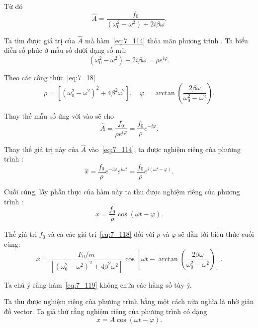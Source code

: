\noindent
Từ đó
\begin{equation}\label{eq:7_116}
	\hat{A} = \frac{f_0}{\left(\omega_0^2 - \omega^2\right) + 2i\beta\omega}.
\end{equation}

\noindent
Ta tìm được giá trị của $\hat{A}$ mà hàm~\eqref{eq:7_114} thỏa mãn phương trình . Ta biểu diễn số phức ở mẫu số dưới dạng số mũ:
\begin{equation}\label{eq:7_117}
	\left(\omega_0^2 - \omega^2\right) + 2i\beta\omega = \rho e^{i\varphi}.
\end{equation}

\noindent
Theo các công thức~\eqref{eq:7_18}
\begin{equation}\label{eq:7_118}
	\rho = \left[\left(\omega_0^2 - \omega^2\right)^2 + 4\beta^2\omega^2\right],\quad  \varphi = \arctan\left(\frac{2\beta\omega}{\omega_0^2 - \omega^2}\right).
\end{equation}

Thay thế mẫu số ứng với  vào  sẽ cho
\begin{equation*}
	\hat{A} = \frac{f_0}{\rho e^{i\varphi}} = \frac{f_0}{\rho}e^{-i\varphi}.
\end{equation*}

\noindent
Thay thế giá trị này của $\hat{A}$ vào~\eqref{eq:7_114}, ta được nghiệm riêng của phương trình :
\begin{equation*}
	\hat{x} = \frac{f_0}{\rho} e^{-i\varphi} e^{i\omega t} = \frac{f_0}{\rho} e^{i(\omega t-\varphi)}.
\end{equation*}

\noindent
Cuối cùng, lấy phần thực của hàm này ta thu được nghiệm riêng của phương trình :
\begin{equation*}
	x = \frac{f_0}{\rho} \cos(\omega t-\varphi).
\end{equation*}

\noindent
Thế giá trị $f_0$ và cả các giá trị~\eqref{eq:7_118} đối với $\rho$ và $\varphi$ sẽ dẫn tới biểu thức cuối cùng:
\begin{equation}\label{eq:7_119}
	x = \frac{F_0/m}{\left[\left(\omega_0^2 - \omega^2\right)^2 + 4\beta^2\omega^2\right]}\cos\left[\omega t - \arctan\left(\frac{2\beta\omega}{\omega_0^2 - \omega^2}\right)\right].
\end{equation}

\noindent
Ta chú ý rằng hàm~\eqref{eq:7_119} không chứa các hằng số tùy ý.

Ta thu được nghiệm riêng của phương trình  bằng một cách nữa nghĩa là nhờ giản đồ vector. Ta giả thử rằng nghiệm riêng của phương trình  có dạng
\begin{equation}\label{eq:7_120}
	x = A\cos(\omega t - \varphi).
\end{equation}

